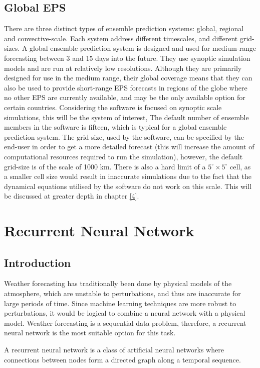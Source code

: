 \subsection{Global EPS}
There are three distinct types of ensemble prediction systems: global, regional and convective-scale. Each system address different timescales, and different grid-sizes. A global ensemble prediction system is designed and used for medium-range forecasting between 3 and 15 days into the future. They use synoptic simulation models and are run at relatively low resolutions. Although they are primarily designed for use in the medium range, their global coverage means that they can also be used to provide short-range EPS forecasts in regions of the globe where no other EPS are currently available, and may be the only available option for certain countries. Considering the software is focused on synoptic scale simulations, this will be the system of interest\cite{intro_efs}, The default number of ensemble members in the software is fifteen, which is typical for a global ensemble prediction system. The grid-size, used by the software, can be specified by the end-user in order to get a more detailed forecast (this will increase the amount of computational resources required to run the simulation), however, the default grid-size is of the scale of 1000 km. There is also a hard limit of a $5^{\circ} \times 5^{\circ}$ cell, as a smaller cell size would result in inaccurate simulations due to the fact that the dynamical equations utilised by the software do not work on this scale. This will be discussed at greater depth in chapter \ref{4}.

\section{Recurrent Neural Network}
\subsection{Introduction}
Weather forecasting has traditionally been done by physical models of the atmosphere, which are unstable to perturbations, and thus are inaccurate for large periods of time\cite{why_rnn}. Since machine learning techniques are more robust to perturbations, it would be logical to combine a neural network with a physical model. Weather forecasting is a sequential data problem, therefore, a recurrent neural network is the most suitable option for this task. 

\begin{definition}
A recurrent neural network is a class of artificial neural networks where connections between nodes form a directed graph along a temporal sequence.
\end{definition}

